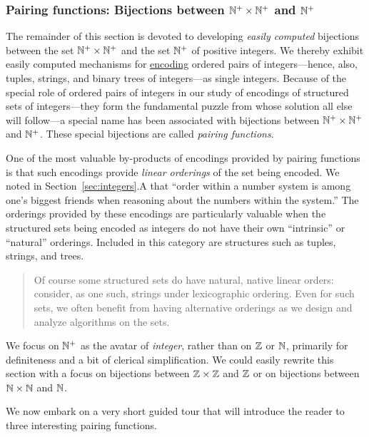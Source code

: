 \subsubsection{Pairing functions: Bijections between $\mathbb{N}^+ \times \mathbb{N}^+$ and $\mathbb{N}^+$}
\label{sec:building-pairing-functions}

The remainder of this section is devoted to developing {\em easily
  computed} bijections between the set $\mathbb{N}^+ \times \mathbb{N}^+$ and the set
$\mathbb{N}^+$ of positive integers.  We thereby exhibit easily computed
mechanisms for \underline{encoding} ordered pairs of integers---hence,
also, tuples, strings, and binary trees of integers---as single
integers.  Because of the special role of ordered pairs of integers in
our study of encodings of structured sets of integers---they form the
fundamental puzzle from whose solution all else will follow---a
special name has been associated with bijections between $\mathbb{N}^+ \times
\mathbb{N}^+$ and $\mathbb{N}^+$.  These special bijections are called {\it pairing
  functions}.  

One of the most valuable by-products of encodings provided by pairing
functions is that such encodings provide {\em linear orderings} of the
set being encoded.  We noted in Section~\ref{sec:integers}.A that
``order within a number system is among one's biggest friends when
reasoning about the numbers within the system.''  The orderings
provided by these encodings are particularly
valuable when the structured sets being encoded as integers do not
have their own ``intrinsic'' or ``natural'' orderings.  Included in
this category are  structures such as tuples,
strings, and trees.
\begin{quote}
Of course some structured sets do have natural, native linear orders:
consider, as one such, strings under lexicographic ordering.  Even for
such sets, we often benefit from having alternative orderings as we
design and analyze algorithms on the sets.
\end{quote}

We focus on $\mathbb{N}^+$ as the avatar of {\it integer}, rather than on $\mathbb{Z}$
or $\mathbb{N}$, primarily for definiteness and a bit of clerical
simplification.  We could easily rewrite this section with a focus on
bijections between $\mathbb{Z} \times \mathbb{Z}$ and $\mathbb{Z}$ or on bijections between
$\mathbb{N} \times \mathbb{N}$ and $\mathbb{N}$.

\bigskip


We now embark on a very short guided tour that will introduce the
reader to three interesting pairing functions.

